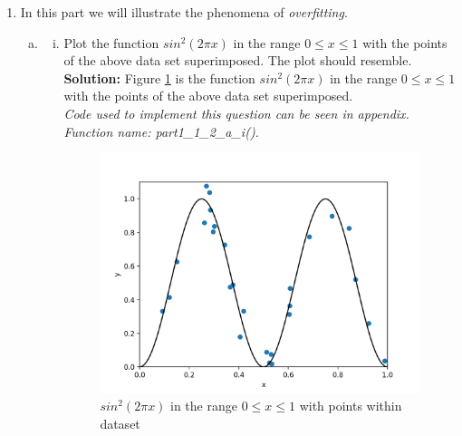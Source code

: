 \documentclass[A4,12pt]{article}
\begin{document}
\begin{enumerate}[1.]
    \item In this part we will illustrate the phenomena of \textit{overfitting}.
        \begin{enumerate}[(a)]
          \item 
            \begin{enumerate}[i.]
            \item Plot the function $sin^2(2\pi x)$ in the range $0 \le x \le 1$ with the points of the above data set superimposed. The plot should resemble.\\
            \textbf{Solution:} Figure \ref{fig:2a1} is the function $sin^2(2\pi x)$ in the range $0 \le x \le 1$ with the points of the above data set superimposed.\\
            \textit{Code used to implement this question can be seen in appendix. Function name: part1\_1\_2\_a\_i().}
              \begin{figure}
              \centering \includegraphics[width=0.8\columnwidth]{2a1}
              \caption{
                \label{fig:2a1}
                $sin^2(2\pi x)$ in the range $0 \le x \le 1$ with points within dataset
              }
              \end{figure}


\end{enumerate}
\end{enumerate}
\end{enumerate}
\end{document}
